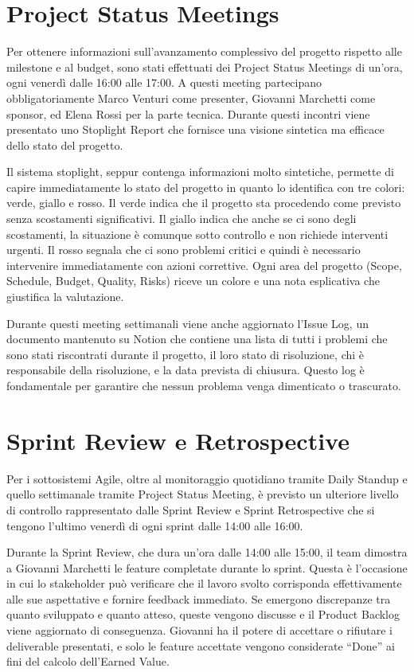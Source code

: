\section{Project Status Meetings}

Per ottenere informazioni sull'avanzamento complessivo del progetto rispetto alle milestone e al budget, sono stati effettuati dei Project Status Meetings di un'ora, ogni venerdì dalle 16:00 alle 17:00. A questi meeting partecipano obbligatoriamente Marco Venturi come presenter, Giovanni Marchetti come sponsor, ed Elena Rossi per la parte tecnica. Durante questi incontri viene presentato uno Stoplight Report che fornisce una visione sintetica ma efficace dello stato del progetto.

Il sistema stoplight, seppur contenga informazioni molto sintetiche, permette di capire immediatamente lo stato del progetto in quanto lo identifica con tre colori: verde, giallo e rosso. Il verde indica che il progetto sta procedendo come previsto senza scostamenti significativi. Il giallo indica che anche se ci sono degli scostamenti, la situazione è comunque sotto controllo e non richiede interventi urgenti. Il rosso segnala che ci sono problemi critici e quindi è necessario intervenire immediatamente con azioni correttive. Ogni area del progetto (Scope, Schedule, Budget, Quality, Risks) riceve un colore e una nota esplicativa che giustifica la valutazione.

Durante questi meeting settimanali viene anche aggiornato l'Issue Log, un documento mantenuto su Notion che contiene una lista di tutti i problemi che sono stati riscontrati durante il progetto, il loro stato di risoluzione, chi è responsabile della risoluzione, e la data prevista di chiusura. Questo log è fondamentale per garantire che nessun problema venga dimenticato o trascurato.

\section{Sprint Review e Retrospective}

Per i sottosistemi Agile, oltre al monitoraggio quotidiano tramite Daily Standup e quello settimanale tramite Project Status Meeting, è previsto un ulteriore livello di controllo rappresentato dalle Sprint Review e Sprint Retrospective che si tengono l'ultimo venerdì di ogni sprint dalle 14:00 alle 16:00.

Durante la Sprint Review, che dura un'ora dalle 14:00 alle 15:00, il team dimostra a Giovanni Marchetti le feature completate durante lo sprint. Questa è l'occasione in cui lo stakeholder può verificare che il lavoro svolto corrisponda effettivamente alle sue aspettative e fornire feedback immediato. Se emergono discrepanze tra quanto sviluppato e quanto atteso, queste vengono discusse e il Product Backlog viene aggiornato di conseguenza. Giovanni ha il potere di accettare o rifiutare i deliverable presentati, e solo le feature accettate vengono considerate ``Done'' ai fini del calcolo dell'Earned Value.

